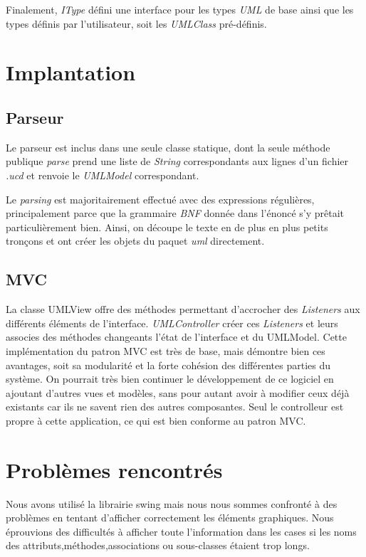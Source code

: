 \documentclass[letter,french]{report}
\begin{document}
  Finalement, \emph{IType} défini une interface pour les types \emph{UML} de
  base ainsi que les types définis par l'utilisateur, soit les \emph{UMLClass}
  pré-définis.
  
	\section*{Implantation}
	
	\subsection*{Parseur}
	Le parseur est inclus dans une seule classe statique, dont la seule méthode
	publique \emph{parse} prend une liste de \emph{String} correspondants aux lignes d'un
	fichier \emph{.ucd} et renvoie le \emph{UMLModel} correspondant. 
	
	Le \emph{parsing} est majoritairement effectué avec des expressions régulières,
	principalement parce que la grammaire \emph{BNF} donnée dans l'énoncé s'y
	prêtait particulièrement bien. Ainsi, on découpe le texte en de plus en plus
	petits tronçons et ont créer les objets du paquet \emph{uml} directement.
	
	\subsection*{MVC}
  La classe UMLView offre des méthodes permettant d'accrocher des
  \emph{Listeners} aux différents éléments de l'interface. \emph{UMLController} créer
  ces \emph{Listeners} et leurs associes des méthodes changeants l'état de
  l'interface et du UMLModel. Cette implémentation du patron MVC est très de
  base, mais démontre bien ces avantages, soit sa modularité et la forte
  cohésion des différentes parties du système. On pourrait très bien continuer
  le développement de ce logiciel en ajoutant d'autres vues et modèles, sans
  pour autant avoir à modifier ceux déjà existants car ils ne savent rien des
  autres composantes. Seul le controlleur est propre à cette application, ce qui
  est bien conforme au patron MVC.
	
	\section*{Problèmes rencontrés}
  Nous avons utilisé la librairie swing mais nous nous sommes confronté à des
  problèmes en tentant d'afficher correctement les éléments graphiques.
  Nous éprouvions des difficultés à afficher toute l'information dans les cases
  si les noms des attributs,méthodes,associations ou sous-classes étaient trop longs.
\end{document}

